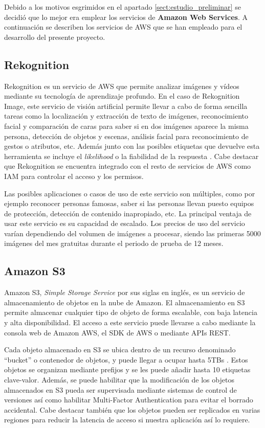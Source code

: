 Debido a los motivos esgrimidos en el apartado \ref{sect:estudio_preliminar} se decidió que lo mejor era emplear los servicios de \textbf{Amazon Web Services}. A continuación se describen los servicios de AWS que se han empleado para el desarrollo del presente proyecto.

\subsection{Rekognition}
\label{sect:rekognition}

Rekognition es un servicio de AWS que permite analizar imágenes y vídeos mediante su tecnología de aprendizaje profundo. En el caso de Rekognition Image, este servicio de visión artificial permite llevar a cabo de forma sencilla tareas como la localización y extracción de texto de imágenes, reconocimiento facial y comparación de caras para saber si en dos imágenes aparece la misma persona, detección de objetos y escenas, análisis facial para reconocimiento de gestos o atributos, etc. Además junto con las posibles etiquetas que devuelve esta herramienta se incluye el \textit{likelihood} o la fiabilidad de la respuesta \cite{amazon_rekognition}. Cabe destacar que Rekognition se encuentra integrado con el resto de servicios de AWS como IAM para controlar el acceso y los permisos.

Las posibles aplicaciones o casos de uso de este servicio son múltiples, como por ejemplo reconocer personas famosas, saber si las personas llevan puesto equipos de protección, detección de contenido inapropiado, etc. La principal ventaja de usar este servicio es su capacidad de escalado. Los precios de uso del servicio varían dependiendo del volumen de imágenes a procesar, siendo las primeras 5000 imágenes del mes gratuitas durante el periodo de prueba de 12 meses.

\subsection{Amazon S3}
Amazon S3, \textit{Simple Storage Service} por sus siglas en inglés, es un servicio de almacenamiento de objetos en la nube de Amazon. El almacenamiento en S3 permite almacenar cualquier tipo de objeto de forma escalable, con baja latencia y alta disponibilidad. El acceso a este servicio puede llevarse a cabo mediante la consola web de Amazon AWS, el SDK de AWS o mediante APIs REST.

Cada objeto almacenado en S3 se ubica dentro de un recurso denominado ``bucket'' o contenedor de objetos, y puede llegar a ocupar hasta 5TBs \cite{amazon_s3}. Estos objetos se organizan mediante prefijos y se les puede añadir hasta 10 etiquetas clave-valor. Además, se puede habilitar que la modificación de los objetos almacenados en S3 pueda ser supervisada mediante sistemas de control de versiones así como habilitar Multi-Factor Authentication para evitar el borrado accidental. Cabe destacar también que los objetos pueden ser replicados en varias regiones para reducir la latencia de acceso si nuestra aplicación así lo requiere.

